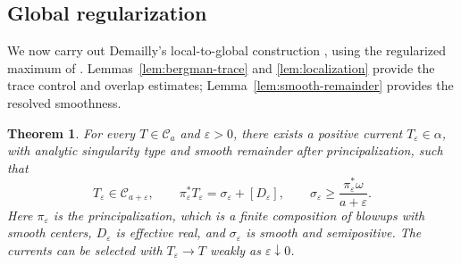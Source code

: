 \documentclass[reqno]{amsart}
\numberwithin{equation}{section}
\newtheorem{theorem}{Theorem}[section]
\theoremstyle{definition}
\begin{document}
\subsection{Global regularization} 
We now carry out Demailly's local-to-global construction
\cite[Section~3]{D92}, using the regularized maximum of
\cite[Chapter~I, Lemma~5.18]{D12}.
Lemmas~\ref{lem:bergman-trace} and
\ref{lem:localization} provide the trace control
and overlap estimates; Lemma~\ref{lem:smooth-remainder}
provides the resolved smoothness.
\begin{theorem}\label{thm:bergman}
For every $T\in\mathcal C_a$ and $\varepsilon>0$, there exists a positive current $T_\varepsilon\in\alpha$, with analytic singularity type and smooth remainder after principalization, such that
\begin{equation}\label{eq:bergman-resolution}
T_\varepsilon\in\mathcal C_{a+\varepsilon},\qquad
\pi_\varepsilon^*T_\varepsilon
 =\sigma_\varepsilon+[D_\varepsilon],\qquad
\sigma_\varepsilon\ge\frac{\pi_\varepsilon^*\omega}{a+\varepsilon}.
\end{equation}
Here $\pi_\varepsilon$ is the principalization, which is a finite composition of blowups with smooth centers, $D_\varepsilon$ is effective real, and $\sigma_\varepsilon$ is smooth and semipositive. The currents can be selected with $T_\varepsilon\to T$ weakly as $\varepsilon\downarrow0$.
\end{theorem}
\end{document}
